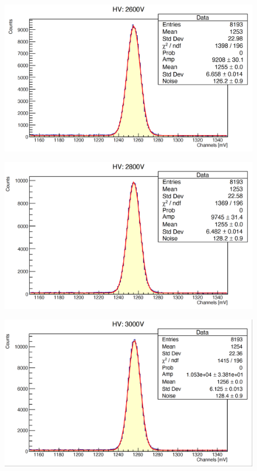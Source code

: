 \documentclass[a4paper,10pt]{article}
\begin{document}
\begin{figure}[H]
    \centering
    \includegraphics[scale=0.45]{appendice/2600}
\end{figure}
\begin{figure}[H]
    \centering
    \includegraphics[scale=0.45]{appendice/2800}
\end{figure}
\begin{figure}[H]
    \centering
    \includegraphics[scale=0.45]{appendice/3000}
\end{figure}
\end{document}
